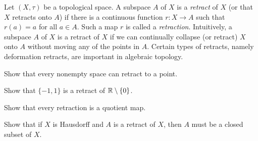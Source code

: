 \item Let $(X,\tau)$ be a topological space. A subspace $A$ of $X$ is a \emph{retract} of $X$ (or that $X$ retracts onto $A$) if there is a continuous function $r : X \to A$ such that $r(a) = a$ for all $a \in A$. Such a map $r$ is called a \emph{retraction}. Intuitively, a subspace $A$ of $X$ is a retract of $X$ if we can continually collapse (or retract) $X$ onto $A$ without moving any of the points in $A$. Certain types of retracts, namely deformation retracts, are important in algebraic topology.
\ba

\item Show that every nonempty space can retract to a point. 

\item Show that $\{-1,1\}$ is a retract of $\mathbb{R} \setminus \{0\}$. 

\item Show that every retraction is a quotient map.

\item Show that if $X$ is Hausdorff and $A$ is a retract of $X$, then $A$ must be a closed subset of $X$. 

\ea


